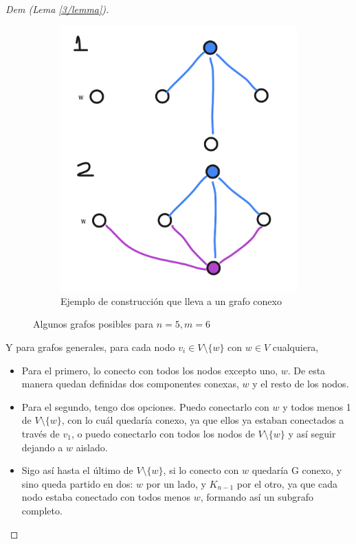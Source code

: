 \documentclass[12pt, a4paper]{report}
\theoremstyle{definition} %
\begin{document}
\begin{enumerate}[a)]
\begin{proof}[Dem (Lema \ref{3/lemma})]
\begin{figure}[H]
\begin{subfigure}{0.4\textwidth}
                \includegraphics[scale=0.15]{img/3-conexo.png}
                \caption{Ejemplo de construcción que lleva a un grafo conexo}
            \end{subfigure}
            \caption{Algunos grafos posibles para $n = 5, m = 6$}
        \end{figure}

        Y para grafos generales, para cada nodo $v_i \in V \setminus \{w\}$ con $w \in V$ cualquiera,

        \begin{itemize}
            \item Para el primero, lo conecto con todos los nodos excepto uno, $w$. De esta manera quedan definidas dos componentes conexas, $w$ y el resto de los nodos.
            \item Para el segundo, tengo dos opciones. Puedo conectarlo con $w$ y todos menos 1 de $V \setminus \{w\}$, con lo cuál quedaría conexo, ya que ellos ya estaban conectados a través de $v_1$, o puedo conectarlo con todos los nodos de $V \setminus \{w\}$ y así seguir dejando a $w$ aislado.
            \item Sigo así hasta el último de $V \setminus \{w\}$, si lo conecto con $w$ quedaría G conexo, y sino queda partido en dos: $w$ por un lado, y $K_{n-1}$ por el otro, ya que cada nodo estaba conectado con todos menos $w$, formando así un subgrafo completo.
        \end{itemize}
    \end{proof}


\end{enumerate}
\end{document}
